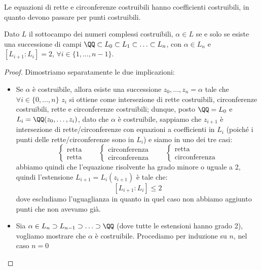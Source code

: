 \documentclass[11pt]{scrartcl}
\begin{document}
\begin{remark}
    Le equazioni di rette e circonferenze costruibili hanno coefficienti costruibili, in quanto devono passare per punti costruibili.
\end{remark}
\pagebreak
\begin{theorem}
    \label{3.76}
    Dato $L$ il sottocampo dei numeri complessi costruibili, $\alpha \in L$ se e solo se esiste una successione di campi $\QQ \subset L_0 \subset L_1 \subset \ldots \subset L_n$, con $\alpha \in L_n$ e $[L_{i+1} : L_i] = 2$, $\forall i \in \{1,\ldots,n-1\}$.
\end{theorem}

\begin{proof}
    Dimostriamo separatamente le due implicazioni:
    \begin{itemize}
        \item Se $\alpha$ è costruibile, allora esiste una successione $z_0,\ldots,z_n = \alpha$ tale che $\forall i \in \{0,\ldots,n\}$ $z_i$ si ottiene come intersezione di rette costruibili, circonferenze costruibili, rette e circonferenze costruibili; dunque, posto
        $\QQ = L_0$ e $L_i = \QQ(z_0,\ldots,z_i)$, dato che $\alpha$ è costruibile, sappiamo che $z_{i+1}$ è intersezione di rette/circonferenze con equazioni a coefficienti in $L_i$ (poiché i punti delle rette/circonferenze sono in $L_i$) e siamo in uno dei tre casi:
        \[ \begin{cases}
            \text{retta}\\
            \text{retta}
            \end{cases}
            \qquad
            \begin{cases}
            \text{circonferenza}\\
            \text{circonferenza}
            \end{cases}
            \qquad
            \begin{cases}
            \text{retta}\\
            \text{circonferenza}
            \end{cases}
            \]
        abbiamo quindi che l'equazione risolvente ha grado minore o uguale a 2, quindi l'estensione $L_{i+1} = L_i(z_{i+1})$ è tale che:
        \[ [L_{i+1} : L_i] \leq 2
            \]
        dove escludiamo l'uguaglianza in quanto in quel caso non abbiamo aggiunto punti che non avevamo già.
        \item Sia $\alpha \in L_n \supset L_{n-1} \supset \ldots \supset \QQ$ (dove tutte le estensioni hanno grado 2), vogliamo mostrare che $\alpha$ è costruibile. Procediamo per induzione su $n$, nel caso $n = 0$

\end{itemize}
\end{proof}
\end{document}
